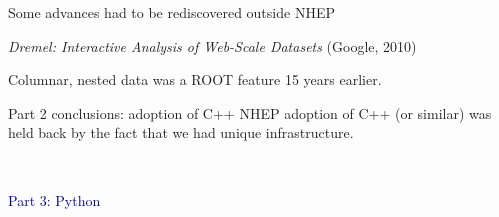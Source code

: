 \documentclass[aspectratio=169]{beamer}
\begin{document}
\begin{frame}{Some advances had to be rediscovered outside NHEP}
\large
\vspace{0.25 cm}
\begin{center}
{\it Dremel: Interactive Analysis of Web-Scale Datasets} (Google, 2010)

\vspace{0.25 cm}

\vspace{0.25 cm}
Columnar, nested data was a ROOT feature 15 years earlier.
\end{center}
\end{frame}

\begin{frame}{Part 2 conclusions: adoption of C++}
\large
\vspace{0.5 cm}
NHEP adoption of C++ (or similar) was held back by the fact that we had unique infrastructure.

\vspace{0.75 cm}

\vspace{0.75 cm}

\vspace{0.75 cm}
\end{frame}

\begin{frame}{\mbox{ }}
\LARGE
\begin{center}
\textcolor{darkblue}{Part 3: Python}
\end{center}
\end{frame}
\end{document}
